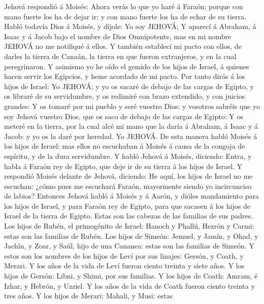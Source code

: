 Jehová respondió á Moisés: Ahora verás lo que yo haré á
Faraón; porque con mano fuerte los ha de dejar ir; y con mano fuerte los
ha de echar de su tierra.  Habló todavía Dios á Moisés, y
díjole: Yo soy JEHOVÁ;  Y aparecí á Abraham, á Isaac y á
Jacob bajo el nombre de Dios Omnipotente, mas en mi nombre JEHOVÁ no me
notifiqué á ellos.  Y también establecí mi pacto con
ellos, de darles la tierra de Canaán, la tierra en que fueron
extranjeros, y en la cual peregrinaron.  Y asimismo yo he
oído el gemido de los hijos de Israel, á quienes hacen servir los
Egipcios, y heme acordado de mi pacto.  Por tanto dirás á
los hijos de Israel: Yo JEHOVÁ; y yo os sacaré de debajo de las cargas
de Egipto, y os libraré de su servidumbre, y os redimiré con brazo
extendido, y con juicios grandes:  Y os tomaré por mi
pueblo y seré vuestro Dios: y vosotros sabréis que yo soy Jehová vuestro
Dios, que os saco de debajo de las cargas de Egipto:  Y os
meteré en la tierra, por la cual alcé mi mano que la daría á Abraham, á
Isaac y á Jacob: y yo os la daré por heredad. Yo JEHOVÁ. 
De esta manera habló Moisés á los hijos de Israel: mas ellos no
escuchaban á Moisés á causa de la congoja de espíritu, y de la dura
servidumbre.  Y habló Jehová á Moisés, diciendo:
 Entra, y habla á Faraón rey de Egipto, que deje ir de su
tierra á los hijos de Israel.  Y respondió Moisés delante
de Jehová, diciendo: He aquí, los hijos de Israel no me escuchan: ¿cómo
pues me escuchará Faraón, mayormente siendo yo incircunciso de labios?
 Entonces Jehová habló á Moisés y á Aarón, y dióles
mandamiento para los hijos de Israel, y para Faraón rey de Egipto, para
que sacasen á los hijos de Israel de la tierra de Egipto.
 Estas son las cabezas de las familias de sus padres. Los
hijos de Rubén, el primogénito de Israel: Hanoch y Phallú, Hezrón y
Carmi: estas son las familias de Rubén.  Los hijos de
Simeón: Jemuel, y Jamín, y Ohad, y Jachîn, y Zoar, y Saúl, hijo de una
Cananea: estas son las familias de Simeón.  Y estos son
los nombres de los hijos de Leví por sus linajes: Gersón, y Coath, y
Merari. Y los años de la vida de Leví fueron ciento treinta y siete
años.  Y los hijos de Gersón: Libni, y Shimi, por sus
familias.  Y los hijos de Coath: Amram, é Izhar, y
Hebrón, y Uzziel. Y los años de la vida de Coath fueron ciento treinta y
tres años.  Y los hijos de Merari: Mahali, y Musi: estas
